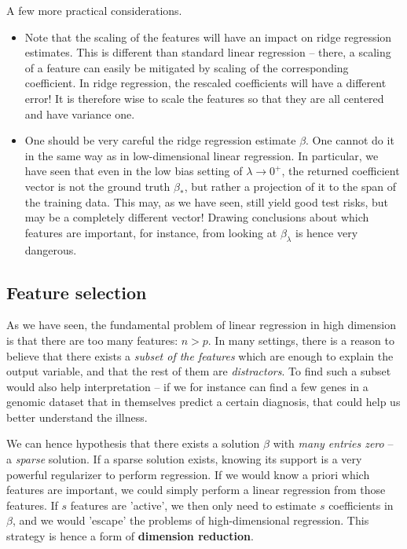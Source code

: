 \documentclass{article}
\begin{document}
A few more practical considerations.
\begin{itemize}
    \item Note that the scaling of the features will have an impact on ridge regression estimates. This is different than standard linear regression -- there, a scaling of a feature can easily be mitigated by scaling of the corresponding coefficient. In ridge regression, the rescaled coefficients will have a different error! It is therefore wise to scale the features so that they are all centered and have variance one.
    \item One should be very careful  the ridge regression estimate  $\beta$. One cannot do it in the same way as in low-dimensional linear regression. In particular, we have seen that even in the low bias setting of $\lambda\to 0^+$, the returned coefficient vector is not the ground truth $\beta_*$, but rather a projection of it to the span of the training data. This may, as we have seen, still yield good test risks, but may be a completely different vector! Drawing conclusions about which features are important, for instance, from looking at $\beta_\lambda$ is hence very dangerous.
\end{itemize}

\subsection{Feature selection}
As we have seen, the fundamental problem of linear regression in high dimension is that there are too many features: $n>p$. In many settings, there is a reason to believe that there exists a \emph{subset of the features} which are enough to explain the output variable, and that the rest of them are \emph{distractors}. To find such a subset would also help interpretation -- if we for instance can find a few genes in a genomic dataset that in themselves predict a certain diagnosis, that could help us better understand the illness.

We can hence hypothesis that there exists a solution $\beta$ with \emph{many entries zero} -- a \emph{sparse} solution. If a sparse solution exists, knowing its support is a very powerful regularizer to perform regression. If we would know a priori which features are important, we could simply perform a linear regression from those features. If $s$ features are 'active', we then only need to estimate $s$ coefficients in $\beta$, and we would 'escape' the problems of high-dimensional regression.
This strategy is hence a form of \textbf{dimension reduction}.
\end{document}
